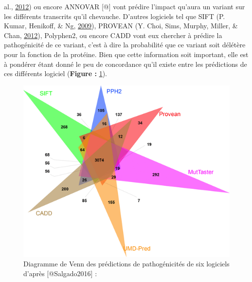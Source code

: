 \documentclass[12pt,twoside]{reedthesis}
\theoremstyle{definition}
\theoremstyle{definition}
\theoremstyle{remark}
\begin{document}
\begin{enumerate}
\begin{enumerate}
      al., \protect\hyperlink{ref-Cingolani2012}{2012}) ou encore ANNOVAR
      {[}@{]} vont prédire l'impact qu'aura un variant sur les différents
      transcrits qu'il chevauche. D'autres logiciels tel que SIFT (P.
      Kumar, Henikoff, \& Ng, \protect\hyperlink{ref-Kumar2009}{2009}),
      PROVEAN (Y. Choi, Sims, Murphy, Miller, \& Chan,
      \protect\hyperlink{ref-Choi2012}{2012}), Polyphen2, ou encore CADD
      vont eux chercher à prédire la pathogénicité de ce variant, c'est à
      dire la probabilité que ce variant soit délétère pour la fonction de
      la protéine. Bien que cette information soit important, elle est à
      pondérer étant donné le peu de concordance qu'il existe entre les
      prédictions de ces différents logiciel (\textbf{Figure :}
      \ref{fig:vennpred}).
    \end{enumerate}
  \end{enumerate}
  
  \begin{figure}
  
  {\centering \includegraphics[scale=.7]{figure/venn_Diag_patho_pred} 
  
  }
  
  \caption[Diagramme de Venn des prédictions de pathogénicités de six logiciels]{Diagramme de Venn des prédictions de pathogénicités de six logiciels d'après [@Salgado2016] : }\label{fig:vennpred}
  \end{figure}
  
\end{document}
